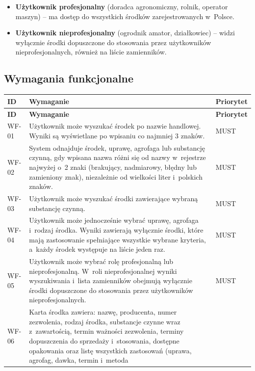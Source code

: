 \begin{itemize}
    \item \textbf{Użytkownik profesjonalny} (doradca agronomiczny, rolnik,
    operator maszyn) -- ma dostęp do wszystkich środków zarejestrowanych
    w~Polsce.
    \item \textbf{Użytkownik nieprofesjonalny} (ogrodnik amator, działkowiec)
    -- widzi wyłącznie środki dopuszczone do stosowania przez użytkowników
    nieprofesjonalnych, również na liście zamienników.
\end{itemize}

\subsection{Wymagania funkcjonalne}

\begingroup
\small
\begin{longtable}{|p{1.4cm}|p{11.4cm}|p{1.6cm}|}
\hline
\textbf{ID} & \textbf{Wymaganie} & \textbf{Priorytet} \\
\hline
\endfirsthead
\hline
\textbf{ID} & \textbf{Wymaganie} & \textbf{Priorytet} \\
\hline
\endhead
WF-01 & Użytkownik może wyszukać środek po nazwie handlowej. Wyniki są
wyświetlane po wpisaniu co najmniej 3 znaków. & MUST \\
\hline
WF-02 & System odnajduje środek, uprawę, agrofaga lub substancję czynną,
gdy wpisana nazwa różni się od nazwy w~rejestrze najwyżej o~2 znaki
(brakujący, nadmiarowy, błędny lub zamieniony znak), niezależnie od
wielkości liter i~polskich znaków. & MUST \\
\hline
WF-03 & Użytkownik może wyszukać środki zawierające wybraną substancję
czynną. & MUST \\
\hline
WF-04 & Użytkownik może jednocześnie wybrać uprawę, agrofaga i~rodzaj środka.
Wyniki zawierają wyłącznie środki, które mają zastosowanie spełniające
wszystkie wybrane kryteria, a~każdy środek występuje na liście jeden raz.
& MUST \\
\hline
WF-05 & Użytkownik może wybrać rolę profesjonalną lub nieprofesjonalną.
W~roli nieprofesjonalnej wyniki wyszukiwania i~lista zamienników obejmują
wyłącznie środki dopuszczone do stosowania przez użytkowników
nieprofesjonalnych. & MUST \\
\hline
WF-06 & Karta środka zawiera: nazwę, producenta, numer zezwolenia, rodzaj
środka, substancje czynne wraz z~zawartością, termin ważności zezwolenia,
terminy dopuszczenia do sprzedaży i~stosowania, dostępne opakowania oraz
listę wszystkich zastosowań (uprawa, agrofag, dawka, termin i~metoda

\end{longtable}
